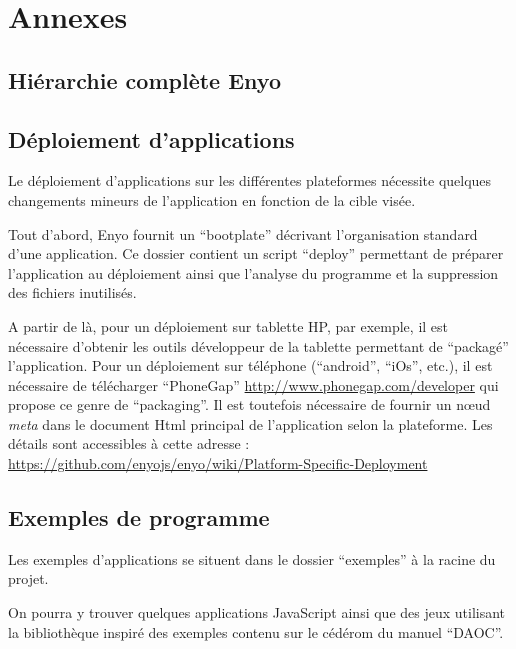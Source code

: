 \documentclass[11pt,a4paper]{report}
\begin{document}
\chapter{Annexes}

\section{Hiérarchie complète Enyo}\label{hier-complet}



\section{Déploiement d'applications}

Le déploiement d'applications sur les différentes plateformes nécessite quelques changements mineurs 
de l'application en fonction de la cible visée.

Tout d'abord, Enyo fournit un ``bootplate'' décrivant l'organisation standard d'une application.
Ce dossier contient un script ``deploy'' permettant de préparer l'application au 
déploiement ainsi que l'analyse du programme et la suppression des fichiers inutilisés.

A partir de là, pour un déploiement sur tablette HP, par exemple, il est nécessaire d'obtenir les outils
développeur de la tablette permettant de ``packagé'' l'application.
Pour un déploiement sur téléphone (``android'', ``iOs'', etc.), il est nécessaire de télécharger
``PhoneGap'' \url{http://www.phonegap.com/developer} qui propose ce genre de ``packaging''.
Il est toutefois nécessaire de fournir un n\oe{}ud \emph{meta} dans le document Html principal de l'application
selon la plateforme.
Les détails sont accessibles à cette adresse : \\
\url{https://github.com/enyojs/enyo/wiki/Platform-Specific-Deployment}

\section{Exemples de programme}

Les exemples d'applications se situent dans le dossier ``exemples'' à la racine du projet.

On pourra y trouver quelques applications JavaScript ainsi que des jeux utilisant la bibliothèque inspiré des exemples contenu sur le cédérom 
du manuel ``DAOC''\cite{DAOC}.

\tableofcontents
\nocite{*}


\end{document}
